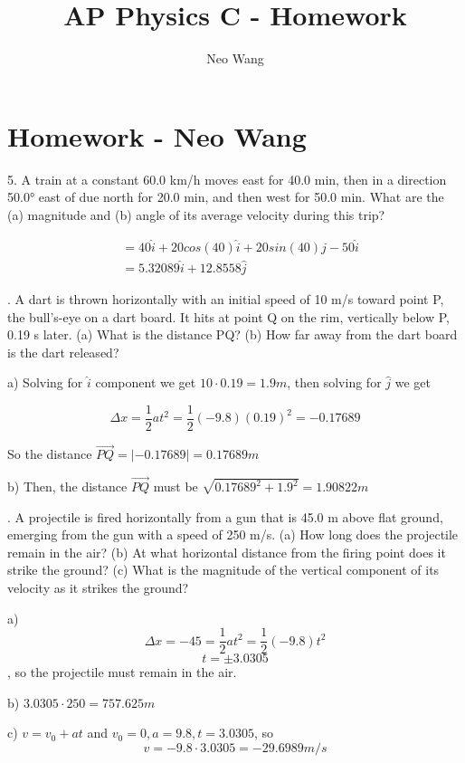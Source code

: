 \documentclass{scrreprt} %
\title{AP Physics C - Homework}
\author{Neo Wang}
\begin{document}
\section{Homework - Neo Wang}

5. A train at a constant 60.0 km/h moves east for 40.0 min,
then  in  a  direction  50.0° east  of  due  north  for  20.0 min, and  then
west for 50.0 min. What are the (a) magnitude and (b) angle of its
average velocity during this trip?

\begin{align*}
	&= 40\hat{i} + 20cos(40)\hat{i} + 20sin(40)\hat{j} - 50 \hat{i} \\
	&= \boxed{5.32089\hat{i} + 12.8558\hat{j}}
\end{align*}

. A dart is thrown horizontally with an initial speed of 
10 m/s  toward  point  P, the  bull’s-eye  on  a  dart  board. It  hits  at
point Q on the rim, vertically below P, 0.19 s later. (a) What is the
distance PQ?  (b)  How  far  away  from  the  dart  board  is  the  dart
released? \newline

a) Solving for $\hat{i}$ component we get $10\cdot 0.19 = 1.9 m$, then solving
for $\hat{j}$ we get

$$\Delta x = \frac{1}{2}at^2 = \frac{1}{2}(-9.8)(0.19)^2=-0.17689$$

So the distance $\vec{PQ} = |-0.17689| = \boxed{0.17689 m}$

b) Then, the distance $\vec{PQ}$ must be $\sqrt{0.17689^2 + 1.9^2} = \boxed{1.90822 m}$\newline

. A projectile is fired horizontally from a gun that is 
45.0 m above flat ground, emerging from the gun with a speed of
250 m/s. (a) How long does the projectile remain in the air? (b) At
what  horizontal  distance  from  the  firing  point  does  it  strike  the
ground? (c) What is the magnitude of the vertical component of its
velocity as it strikes the ground? \newline

a) $$\Delta x = -45 = \frac{1}{2}at^2 = \frac{1}{2}(-9.8)t^2$$
$$t = \pm 3.0305$$, so the projectile must remain  in the air.

b) $3.0305\cdot 250 = \boxed{757.625 m}$

c) $v = v_0 + at$ and $v_0 = 0, a = 9.8, t = 3.0305$, so $$v = -9.8\cdot 3.0305 = \boxed{-29.6989 m/s}$$
\end{document}
